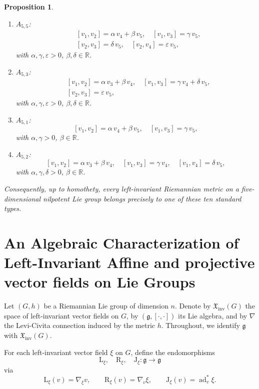 \documentclass[10pt]{article}
\newtheorem{Proposition}{Proposition}
\begin{document}
\begin{Proposition}
\begin{enumerate}
  \item \(A_{5,5}\):
  \[
  \begin{aligned}
    &[v_1,v_2]=\alpha\,v_4+\beta\,v_5,\quad [v_1,v_3]=\gamma\,v_5,\\
    &[v_2,v_3]=\delta\,v_5,\quad [v_2,v_4]=\varepsilon\,v_5,
  \end{aligned}
  \]
  with \(\alpha,\gamma,\varepsilon>0\), \(\beta,\delta\in\mathbb{R}\).

  \item \(A_{5,3}\):
  \[
  \begin{aligned}
    &[v_1,v_2]=\alpha\,v_3+\beta\,v_4,\quad [v_1,v_3]=\gamma\,v_4+\delta\,v_5,\\
    &[v_2,v_3]=\varepsilon\,v_5,
  \end{aligned}
  \]
  with \(\alpha,\gamma,\varepsilon>0\), \(\beta,\delta\in\mathbb{R}\).

  \item \(A_{5,1}\):
  \[
    [v_1,v_2]=\alpha\,v_4+\beta\,v_5,\quad [v_1,v_3]=\gamma\,v_5,
  \]
  with \(\alpha,\gamma>0\), \(\beta\in\mathbb{R}\).

  \item \(A_{5,2}\):
  \[
    [v_1,v_2]=\alpha\,v_3+\beta\,v_4,\quad [v_1,v_3]=\gamma\,v_4,\quad [v_1,v_4]=\delta\,v_5,
  \]
  with \(\alpha,\gamma,\delta>0\), \(\beta\in\mathbb{R}\).
\end{enumerate}

Consequently, up to homothety, every left-invariant Riemannian metric on a five-dimensional nilpotent Lie group belongs precisely to one of these ten standard types.

\end{Proposition}
\section{An Algebraic Characterization of Left-Invariant Affine and projective vector fields on Lie Groups}

Let $(G,h)$ be a Riemannian Lie group of dimension \(n\). Denote by \(\mathfrak{X}_{\mathrm{inv}}(G)\) the space of left-invariant vector fields on \(G\), by \((\mathfrak{g},[\cdot,\cdot])\) its Lie algebra, and by \(\nabla\) the Levi-Civita connection induced by the metric \(h\). Throughout, we identify \(\mathfrak{g}\) with \(\mathfrak{X}_{\mathrm{inv}}(G)\).

For each left-invariant vector field \(\xi\) on \(G\), define the endomorphisms
\[
\mathrm{L}_\xi,\quad \mathrm{R}_\xi,\quad \mathrm{J}_\xi:\mathfrak{g}\to\mathfrak{g}
\]
via
\[
\mathrm{L}_\xi(v)=\nabla_\xi v,\qquad
\mathrm{R}_\xi(v)=\nabla_v\xi,\qquad
\mathrm{J}_\xi(v)=\operatorname{ad}^*_v\xi.
\]
\end{document}
